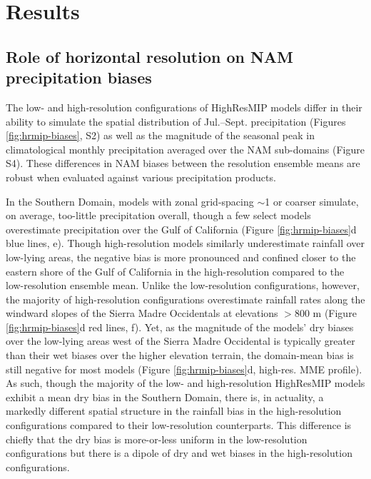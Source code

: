 \documentclass[draft]{agujournal2019}
\begin{document}
\section{Results}
\subsection{Role of horizontal resolution on NAM precipitation biases}
The low- and high-resolution configurations of HighResMIP models differ in their ability to simulate the spatial distribution of Jul.--Sept. precipitation (Figures \ref{fig:hrmip-biases}, S2) as well as the magnitude of the seasonal peak in climatological monthly precipitation averaged over the NAM sub-domains (Figure S4). These differences in NAM biases between the resolution ensemble means are robust when evaluated against various precipitation products.

In the Southern Domain, models with zonal grid-spacing $\sim$1\textdegree{} or coarser simulate, on average, too-little precipitation overall, though a few select models overestimate precipitation over the Gulf of California (Figure \ref{fig:hrmip-biases}d blue lines, e). Though high-resolution models similarly underestimate rainfall over low-lying areas, the negative bias is more pronounced and confined closer to the eastern shore of the Gulf of California in the high-resolution compared to the low-resolution ensemble mean. Unlike the low-resolution configurations, however, the majority of high-resolution configurations overestimate rainfall rates along the windward slopes of the Sierra Madre Occidentals at elevations $>$800 m (Figure \ref{fig:hrmip-biases}d red lines, f). Yet, as the magnitude of the models' dry biases over the low-lying areas west of the Sierra Madre Occidental is typically greater than their wet biases over the higher elevation terrain, the domain-mean bias is still negative for most models (Figure \ref{fig:hrmip-biases}d, high-res. MME profile). As such, though the majority of the low- and high-resolution HighResMIP models exhibit a mean dry bias in the Southern Domain, there is, in actuality, a markedly different spatial structure in the rainfall bias in the high-resolution configurations compared to their low-resolution counterparts. This difference is chiefly that the dry bias is more-or-less uniform in the low-resolution configurations but there is a dipole of dry and wet biases in the high-resolution configurations.
\end{document}
